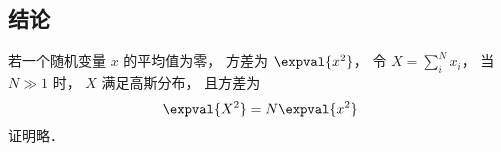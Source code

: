 \subsection{结论}
若一个随机变量 $x$ 的平均值为零， 方差为 $\expval{x^2}$， 令 $X = \sum_i^N x_i$， 当 $N \gg 1$ 时， $X$ 满足高斯分布， 且方差为
\begin{equation}
\expval{X^2} = N\expval{x^2}
\end{equation}
证明略．